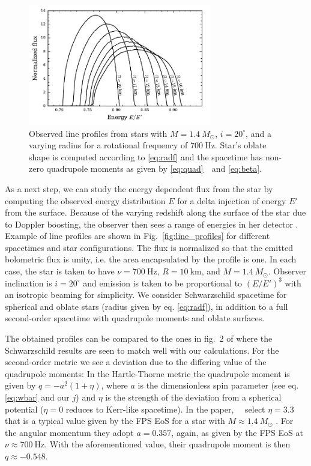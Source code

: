 \documentclass[iop, usenatbib]{emulateapj}
\newcommand{\sch}{Schwarzschild }
\newcommand{\Msun}{\ensuremath{M_{\odot}}}
\begin{document}
\begin{figure}
\includegraphics[width=8cm]{figs/fig9c.pdf}
\caption{\label{fig:line_profiles_sweep}
  Observed line profiles from stars with $M = 1.4~\Msun$, $i = 20^{\circ}$, and a varying radius for a rotational frequency of $700~\mathrm{Hz}$.
  Star's oblate shape is computed according to \eqref{eq:radf} and the spacetime has non-zero quadrupole moments as given by \eqref{eq:quad}~ and \eqref{eq:beta}.
  }
\end{figure}

As a next step, we can study the energy dependent flux from the star by computing the observed energy distribution $E$ for a delta injection of energy $E'$ from the surface.
Because of the varying redshift along the surface of the star due to Doppler boosting, the observer then sees a range of energies in her detector \citep{OP03,BML06,CMB06}.
Example of line profiles are shown in Fig.~\ref{fig:line_profiles} for different spacetimes and star configurations.
The flux is normalized so that the emitted bolometric flux is unity, i.e. the area encapsulated by the profile is one.
In each case, the star is taken to have $\nu = 700~\mathrm{Hz}$, $R = 10~\mathrm{km}$, and $M=1.4~\Msun$.
Observer inclination is $i=20^{\circ}$ and emission is taken to be proportional to $(E/E')^3$ with an isotropic beaming for simplicity.
We consider \sch spacetime for spherical and oblate stars (radius given by eq. \eqref{eq:radf}), in addition to a full second-order spacetime with quadrupole moments and oblate surfaces.

The obtained profiles can be compared to the ones in fig.~2 of \citealt{BPO13} where the \sch results are seen to match well with our calculations.
For the second-order metric we see a deviation due to the differing value of the quadrupole moments:
In the Hartle-Thorne metric \citep{HT68} the quadrupole moment is given by $q = -a^2 (1 + \eta)$, where $a$ is the dimensionless spin parameter (see eq. \eqref{eq:wbar} and our $j$) and $\eta$ is the strength of the deviation from a spherical potential ($\eta = 0$ reduces to Kerr-like spacetime).
In the paper, \citealt{BPO13}~ select $\eta=3.3$ that is a typical value given by the FPS EoS \citep{FPS} for a star with $M\approx1.4~\Msun$ \citep[see ][]{LP99}.
For the angular momentum they adopt $a = 0.357$, again, as given by the FPS EoS at $\nu \approx 700~\mathrm{Hz}$.
With the aforementioned value, their quadrupole moment is then $q \approx -0.548$.
\end{document}
